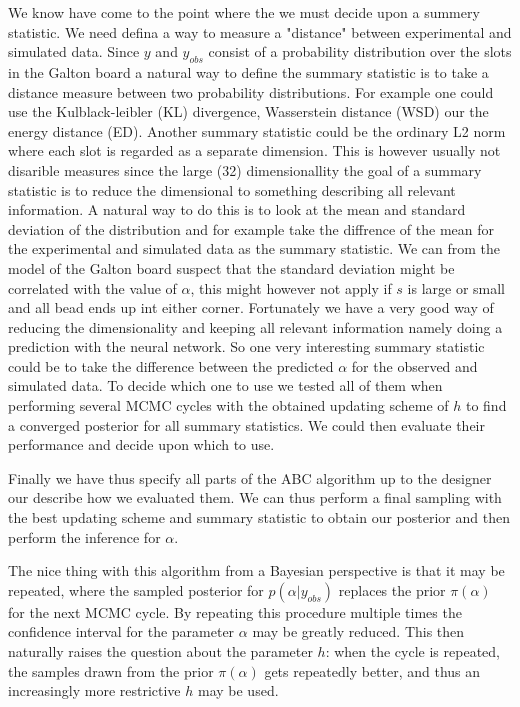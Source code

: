 \documentclass[11pt,a4paper]{article}
\begin{document}
We know have come to the point where the we must decide upon a summery statistic. We need defina a way to measure a "distance" between experimental and simulated data. Since $y$ and $y_{obs}$ consist of a probability distribution over the slots in the Galton board a natural way to define the summary statistic is to take a distance measure between two probability distributions. For example one could use the Kulblack-leibler (KL) divergence, Wasserstein distance (WSD) our the energy distance (ED). Another summary statistic could be the ordinary L2 norm where each slot is regarded as a separate dimension. This is however usually not disarible measures since the large (32) dimensionallity the goal of a summary statistic is to reduce the dimensional to something describing all relevant information. A natural way to do this is to look at the mean and standard deviation of the distribution and for example take the diffrence of the mean for the experimental and simulated data as the summary statistic. We can from the model of the Galton board suspect that the standard deviation might be correlated with the value of $\alpha$, this might however not apply if $s$ is large or small and all bead ends up int either corner. Fortunately we have a very good way of reducing the dimensionality and keeping all relevant information namely doing a prediction with the neural network. So one very interesting summary statistic could be to take the difference between the predicted $\alpha$ for the observed and simulated data. To decide which one to use we tested all of them when performing several MCMC cycles with the obtained updating scheme of $h$ to find a converged posterior for all summary statistics. We could then evaluate their performance and decide upon which to use.

Finally we have thus specify all parts of the ABC algorithm up to the designer our describe how we evaluated them. We can thus perform a final sampling with the best updating scheme and summary statistic to obtain our posterior and then perform the inference for $\alpha$.


The nice thing with this algorithm from a Bayesian perspective is that it may be repeated, where the sampled posterior for $p(\alpha|y_{obs})$ replaces the prior $\pi(\alpha)$ for the next MCMC cycle. By repeating this procedure multiple times the confidence interval for the parameter $\alpha$ may be greatly reduced. This then naturally raises the question about the parameter $h$: when the cycle is repeated, the samples drawn from the prior $\pi(\alpha)$ gets repeatedly better, and thus an increasingly more restrictive $h$ may be used. 
\end{document}
